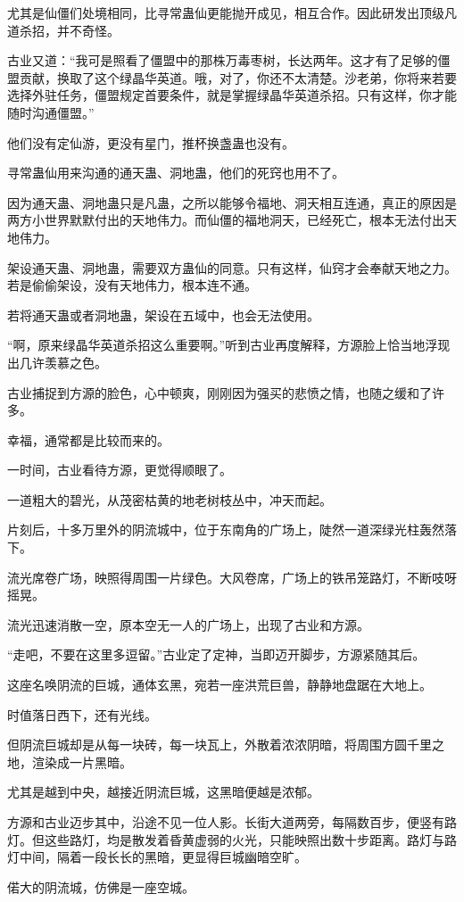 \begin{this_body}
尤其是仙僵们处境相同，比寻常蛊仙更能抛开成见，相互合作。因此研发出顶级凡道杀招，并不奇怪。

古业又道：“我可是照看了僵盟中的那株万毒枣树，长达两年。这才有了足够的僵盟贡献，换取了这个绿晶华英道。哦，对了，你还不太清楚。沙老弟，你将来若要选择外驻任务，僵盟规定首要条件，就是掌握绿晶华英道杀招。只有这样，你才能随时沟通僵盟。”

他们没有定仙游，更没有星门，推杯换盏蛊也没有。

寻常蛊仙用来沟通的通天蛊、洞地蛊，他们的死窍也用不了。

因为通天蛊、洞地蛊只是凡蛊，之所以能够令福地、洞天相互连通，真正的原因是两方小世界默默付出的天地伟力。而仙僵的福地洞天，已经死亡，根本无法付出天地伟力。

架设通天蛊、洞地蛊，需要双方蛊仙的同意。只有这样，仙窍才会奉献天地之力。若是偷偷架设，没有天地伟力，根本连不通。

若将通天蛊或者洞地蛊，架设在五域中，也会无法使用。

“啊，原来绿晶华英道杀招这么重要啊。”听到古业再度解释，方源脸上恰当地浮现出几许羡慕之色。

古业捕捉到方源的脸色，心中顿爽，刚刚因为强买的悲愤之情，也随之缓和了许多。

幸福，通常都是比较而来的。

一时间，古业看待方源，更觉得顺眼了。

一道粗大的碧光，从茂密枯黄的地老树枝丛中，冲天而起。

片刻后，十多万里外的阴流城中，位于东南角的广场上，陡然一道深绿光柱轰然落下。

流光席卷广场，映照得周围一片绿色。大风卷席，广场上的铁吊笼路灯，不断吱呀摇晃。

流光迅速消散一空，原本空无一人的广场上，出现了古业和方源。

“走吧，不要在这里多逗留。”古业定了定神，当即迈开脚步，方源紧随其后。

这座名唤阴流的巨城，通体玄黑，宛若一座洪荒巨兽，静静地盘踞在大地上。

时值落日西下，还有光线。

但阴流巨城却是从每一块砖，每一块瓦上，外散着浓浓阴暗，将周围方圆千里之地，渲染成一片黑暗。

尤其是越到中央，越接近阴流巨城，这黑暗便越是浓郁。

方源和古业迈步其中，沿途不见一位人影。长街大道两旁，每隔数百步，便竖有路灯。但这些路灯，均是散发着昏黄虚弱的火光，只能映照出数十步距离。路灯与路灯中间，隔着一段长长的黑暗，更显得巨城幽暗空旷。

偌大的阴流城，仿佛是一座空城。


\end{this_body}

